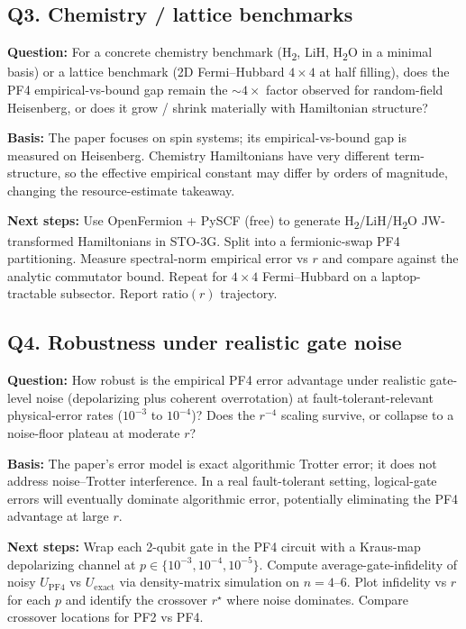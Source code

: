 \subsection*{Q3. Chemistry / lattice benchmarks}
\textbf{Question:} For a concrete chemistry benchmark
(H\textsubscript{2}, LiH, H\textsubscript{2}O in a minimal basis) or a
lattice benchmark (2D Fermi--Hubbard $4\times 4$ at half filling), does
the PF4 empirical-vs-bound gap remain the ${\sim}4\times$ factor
observed for random-field Heisenberg, or does it grow / shrink materially
with Hamiltonian structure?

\textbf{Basis:} The paper focuses on spin systems; its empirical-vs-bound
gap is measured on Heisenberg. Chemistry Hamiltonians have very different
term-structure, so the effective empirical constant may differ by orders
of magnitude, changing the resource-estimate takeaway.

\textbf{Next steps:} Use OpenFermion + PySCF (free) to generate
H\textsubscript{2}/LiH/H\textsubscript{2}O JW-transformed Hamiltonians in
STO-3G. Split into a fermionic-swap PF4 partitioning. Measure
spectral-norm empirical error vs $r$ and compare against the analytic
commutator bound. Repeat for $4\times 4$ Fermi--Hubbard on a
laptop-tractable subsector. Report $\text{ratio}(r)$ trajectory.

\subsection*{Q4. Robustness under realistic gate noise}
\textbf{Question:} How robust is the empirical PF4 error advantage under
realistic gate-level noise (depolarizing plus coherent overrotation) at
fault-tolerant-relevant physical-error rates ($10^{-3}$ to $10^{-4}$)?
Does the $r^{-4}$ scaling survive, or collapse to a noise-floor plateau
at moderate $r$?

\textbf{Basis:} The paper's error model is exact algorithmic Trotter
error; it does not address noise--Trotter interference. In a real
fault-tolerant setting, logical-gate errors will eventually dominate
algorithmic error, potentially eliminating the PF4 advantage at large $r$.

\textbf{Next steps:} Wrap each 2-qubit gate in the PF4 circuit with a
Kraus-map depolarizing channel at $p\in\{10^{-3},10^{-4},10^{-5}\}$.
Compute average-gate-infidelity of noisy $U_{\text{PF4}}$ vs
$U_{\text{exact}}$ via density-matrix simulation on $n=4$--$6$. Plot
infidelity vs $r$ for each $p$ and identify the crossover $r^\star$
where noise dominates. Compare crossover locations for PF2 vs PF4.

